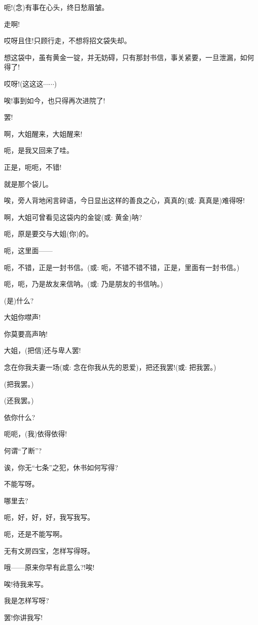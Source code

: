{呃!({\akai 念})有事在心头，终日愁眉皱。}

{走啊!}

{哎呀且住!只顾行走，不想将招文袋失却。}

{想这袋中，虽有黄金一锭，并无妨碍，只有那封书信，事关紧要，一旦泄漏，如何得了!}

{哎呀!(这这这$\cdots{}\cdots{}$)}

{唉!事到如今，也只得再次进院了!}

{罢!}

{啊，大姐醒来，大姐醒来!}

{呃，是我又回来了哇。}

{正}是，呃呃，不错!

就是那个袋儿。

唉，旁人背地闲言碎语，今日显出这样的善良之心，真真的({\akai 或}: 真真是)难得呀!

{啊，大姐可曾看见这袋内的金锭({\akai 或}: 黄金)呐?}

{呃，原是要交与大姐(你)的。}

{呃，这里面------}

{呃，不错，正是一封书信。({\akai 或}: 呃，不错不错不错，正是，里面有一封书信。)}

{呃，呃，乃是故友来信呐。({\akai 或}: 乃是朋友的书信呐。)}

{(是)什么?}

{大姐你噤声!}

{你莫要高声呐!}

{大姐，(把信)还与卑人罢!}

{念在你我夫妻一场({\akai 或}: 念在你我从先的恩爱)，把还我罢!({\akai 或}: 把我罢。)}

{(把我罢。)}

{(还我罢。)}

{依你什么?}

{呃呃，(我)依得依得!}

{何谓``了断''?}

{诶，你无``七条''之犯，休书如何写得?}

{不能写呀。}

{哪里去?}

{呃，好，好，好，我写我写。}

{呃，还是不能写啊。}

{无有文房四宝，怎样写得呀。}

{哦------原来你早有此意么?!唉!}

{唉!待我来写。}

{我是怎样写呀?}

{罢!你讲我写!}

